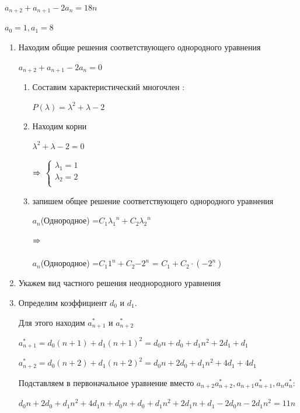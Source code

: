 \documentclass[12pt, a4paper, oneside]{article}
\theoremstyle{plain} %
\theoremstyle{definition}
\begin{document}
$a_{n+2} +  a_{n+1} -2 a_n = 18n$

$a_0 = 1, a_1 = 8$

\begin{enumerate}

\item Находим общие решения соответствующего однородного уравнения 

$a_{n+2} + a_{n+1}-2a_n=0$
    \begin{enumerate}
        \item  Составим характеристический многочлен :
        
        $P(\lambda) = \lambda^2 + \lambda - 2$
        \item Находим  корни
        
        $\lambda^2 + \lambda -2 = 0$
        
        $\xRightarrow[]{}$
        $
        \begin{cases}
         \lambda_1 = 1 \\ 
         \lambda_2 = 2 \\
        \end{cases}
        $
        \item запишем общее решение соответствующего однородного уравнения 
        
        $a_n$(Однородное) =$C_1 {{\lambda}_1}^n  + C_2 {{\lambda}_2}^n $
        
        $\xRightarrow[]{}$
        
        $a_n$(Однородное) =$C_1 {1}^n  + C_2 {-2}^n $ = $C_1 + C_2 \cdot ({-2}^n) $
    \end{enumerate}


\item Укажем вид частного решения неоднородного уравнения 

\item Определим коэффициент ${d}_0 \text{ и }  {d}_1 $. 

Для этого находим $a_{n+1}^* \text{ и } a_{n+2}^*$

$a_{n+1}^* = d_0 (n+1) + d_1 (n+1)^2 = d_0 n + d_0 + d_1 n^2 + 2 d_1 + d_1$

$a_{n+2}^* = d_0 (n+2) + d_1 (n+2)^2 = d_0 n + 2 d_0 + d_1 n^2 + 4 d_1 + 4 d_1 $

Подставляем в первоначальное уравнение вместо  $a_{n+2} a_{n+2}^*, a_{n+1} a_{n+1}^*, a_{n} a_{n}^*$:

$d_0 n + 2 d_0 + d_1 n^2 + 4 d_1 n + d_0 n+ d_0 + d_1 n^2 + 2 d_1 n + d_1 - 2 d_0 n - 2 d_1 n^2 = 11 n  $


\end{enumerate}
\end{document}
